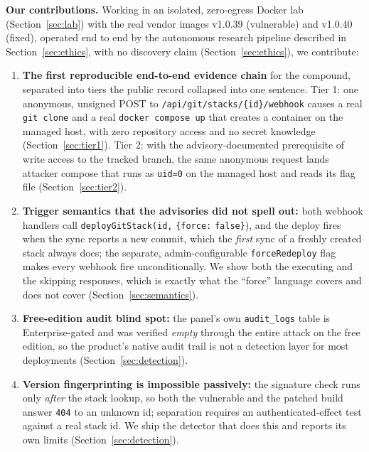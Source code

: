 \documentclass[journal]{IEEEtran}
\begin{document}
\textbf{Our contributions.} Working in an isolated, zero-egress Docker lab
(Section~\ref{sec:lab}) with the real vendor images v1.0.39 (vulnerable) and
v1.0.40 (fixed), operated end to end by the autonomous research pipeline
described in Section~\ref{sec:ethics}, with no discovery claim
(Section~\ref{sec:ethics}), we contribute:
\begin{enumerate}
\item \textbf{The first reproducible end-to-end evidence chain} for the
      compound, separated into tiers the public record collapsed into one
      sentence. Tier 1: one anonymous, unsigned POST to
      \texttt{/api/git/stacks/}\texttt{\{id\}}\texttt{/webhook} causes a real
      \texttt{git clone} and a real \texttt{docker compose up} that creates a
      container on the managed host, with zero repository access and no
      secret knowledge (Section~\ref{sec:tier1}). Tier 2: with the
      advisory-documented prerequisite of write access to the tracked branch,
      the same anonymous request lands attacker compose that runs as
      \texttt{uid=0} on the managed host and reads its flag file
      (Section~\ref{sec:tier2}).
\item \textbf{Trigger semantics that the advisories did not spell out:} both
      webhook handlers call \texttt{deployGitStack(id,} \texttt{\{force:}
      \texttt{false\}}), and the deploy fires when the sync reports a new
      commit, which the \emph{first} sync of a freshly created stack always
      does; the separate, admin-configurable \texttt{forceRedeploy} flag makes
      every webhook fire unconditionally. We show both the executing and the
      skipping responses, which is exactly what the ``force'' language covers
      and does not cover (Section~\ref{sec:semantics}).
\item \textbf{Free-edition audit blind spot:} the panel's own
      \texttt{audit\_logs} table is Enterprise-gated and was verified
      \emph{empty} through the entire attack on the free edition, so the
      product's native audit trail is not a detection layer for most
      deployments (Section~\ref{sec:detection}).
\item \textbf{Version fingerprinting is impossible passively:} the signature
      check runs only \emph{after} the stack lookup, so both the vulnerable
      and the patched build answer \texttt{404} to an unknown id; separation
      requires an authenticated-effect test against a real stack id. We ship
      the detector that does this and reports its own limits
      (Section~\ref{sec:detection}).

\end{enumerate}
\end{document}
